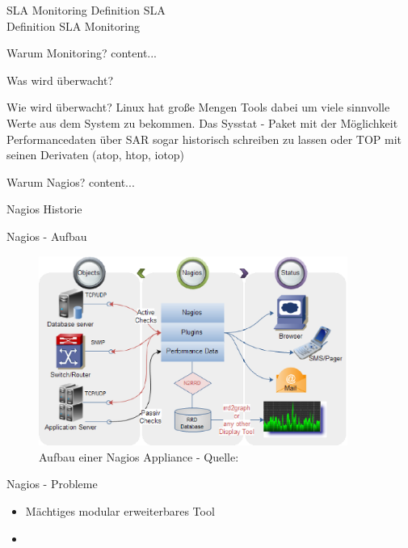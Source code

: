 \documentclass[11pt]{beamer}
\begin{document}
\begin{frame}{SLA Monitoring}
	Definition SLA \\
	Definition SLA Monitoring
\end{frame}
\begin{frame}{Warum Monitoring?}
	content...
\end{frame}
\begin{frame}{Was wird überwacht?}
	
\end{frame}
\begin{frame}{Wie wird überwacht?}
	Linux hat große Mengen Tools dabei um viele sinnvolle Werte aus dem System zu bekommen. Das Sysstat - Paket mit der Möglichkeit Performancedaten über SAR sogar historisch schreiben zu lassen oder TOP mit seinen Derivaten (atop, htop, iotop)
\end{frame}
\begin{frame}{Warum Nagios?}
	content...
\end{frame}
\begin{frame}{Nagios Historie}

\end{frame}
\begin{frame}{Nagios - Aufbau}
	\begin{figure}
		\centering
		\includegraphics[width=0.9\textwidth]{pics/NagiosMonitoring.eps}
		\caption[Grober Aufbau von Nagios]{Aufbau einer Nagios Appliance - Quelle: \textcite{nagiosaufbau}}
	\end{figure}
\end{frame}
\begin{frame}{Nagios - Probleme}
	\begin{itemize}
		\item Mächtiges modular erweiterbares Tool
		\item 
	\end{itemize}
\end{frame}
\end{document}
